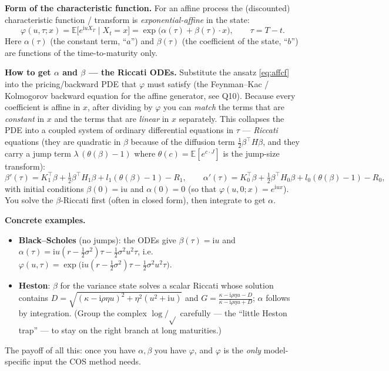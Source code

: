 \documentclass[11pt]{article}
\newcommand{\E}{\mathbb{E}}
\newcommand{\ii}{\mathrm{i}}
\newcommand{\ch}{\varphi}
\begin{document}
\textbf{Form of the characteristic function.} For an affine process the (discounted) characteristic
function / transform is \emph{exponential-affine} in the state:
\begin{equation}\label{eq:affcf}
\boxed{\;\ch(u,\tau;x)=\E\big[e^{\ii u X_T}\mid X_t=x\big]=\exp\big(\alpha(\tau)+\beta(\tau)\cdot x\big),\qquad
\tau=T-t.\;}
\end{equation}
Here $\alpha(\tau)$ (the constant term, ``$a$'') and $\beta(\tau)$ (the coefficient of the state, ``$b$'')
are functions of the time-to-maturity only.

\textbf{How to get $\alpha$ and $\beta$ --- the Riccati ODEs.} Substitute the ansatz \eqref{eq:affcf} into the
pricing/backward PDE that $\ch$ must satisfy (the Feynman--Kac / Kolmogorov backward equation for the affine
generator, see Q10). Because every coefficient is affine in $x$, after dividing by $\ch$ you can \emph{match}
the terms that are \emph{constant} in $x$ and the terms that are \emph{linear} in $x$ separately. This collapses
the PDE into a coupled system of ordinary differential equations in $\tau$ --- \emph{Riccati} equations (they
are quadratic in $\beta$ because of the diffusion term $\tfrac12\beta^{\!\top}H\beta$, and they carry a jump
term $\lambda\,(\theta(\beta)-1)$ where $\theta(c)=\E[e^{c\cdot J}]$ is the jump-size transform):
\[
\beta'(\tau)=K_1^{\!\top}\beta+\tfrac12\beta^{\!\top}H_1\beta+l_1(\theta(\beta)-1)-R_1,\qquad
\alpha'(\tau)=K_0^{\!\top}\beta+\tfrac12\beta^{\!\top}H_0\beta+l_0(\theta(\beta)-1)-R_0,
\]
with initial conditions $\beta(0)=\ii u$ and $\alpha(0)=0$ (so that $\ch(u,0;x)=e^{\ii u x}$). You solve the
$\beta$-Riccati first (often in closed form), then integrate to get $\alpha$.

\textbf{Concrete examples.}
\begin{itemize}
  \item \textbf{Black--Scholes} (no jumps): the ODEs give $\beta(\tau)=\ii u$ and
  $\alpha(\tau)=\ii u(r-\tfrac12\sigma^2)\tau-\tfrac12\sigma^2u^2\tau$, i.e.\
  $\ch(u,\tau)=\exp\!\big(\ii u(r-\tfrac12\sigma^2)\tau-\tfrac12\sigma^2u^2\tau\big)$.
  \item \textbf{Heston}: $\beta$ for the variance state solves a scalar Riccati whose solution contains
  $D=\sqrt{(\kappa-\ii\rho\eta u)^2+\eta^2(u^2+\ii u)}$ and $G=\tfrac{\kappa-\ii\rho\eta u-D}{\kappa-\ii\rho\eta u+D}$;
  $\alpha$ follows by integration. (Group the complex $\log/\sqrt{}$ carefully --- the ``little Heston trap'' ---
  to stay on the right branch at long maturities.)
\end{itemize}
The payoff of all this: once you have $\alpha,\beta$ you have $\ch$, and $\ch$ is the \emph{only} model-specific
input the COS method needs.
\end{document}
